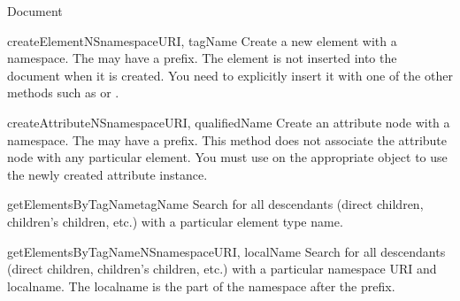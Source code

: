 \begin{classdesc}{Document}{}
\begin{methoddesc}{createElementNS}{namespaceURI, tagName}
Create a new element with a namespace.  The  may have a
prefix.  The element is not inserted into the document when it is
created.  You need to explicitly insert it with one of the other
methods such as  or .
\end{methoddesc}


\begin{methoddesc}{createAttributeNS}{namespaceURI, qualifiedName}
Create an attribute node with a namespace.  The  may have
a prefix.  This method does not associate the attribute node with any
particular element. You must use  on the
appropriate  object to use the newly created attribute
instance.
\end{methoddesc}

\begin{methoddesc}{getElementsByTagName}{tagName}
Search for all descendants (direct children, children's children,
etc.) with a particular element type name.
\end{methoddesc}

\begin{methoddesc}{getElementsByTagNameNS}{namespaceURI, localName}
Search for all descendants (direct children, children's children,
etc.) with a particular namespace URI and localname.  The localname is
the part of the namespace after the prefix.
\end{methoddesc}

\end{classdesc}


